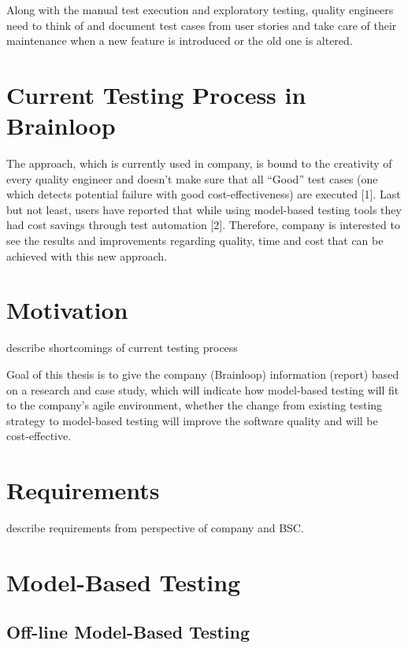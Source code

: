 


Along with the manual test execution and exploratory testing, quality engineers need to think of and document test cases from user stories and take care of their maintenance when a new feature is introduced or the old one is altered. 

\section{Current Testing Process in Brainloop}

The approach, which is currently used in company, is bound to the creativity of every quality engineer and doesn’t make sure that all “Good” test cases (one which detects potential failure with good cost-effectiveness) are executed [1]. Last but not least, users have reported that while using model-based testing tools they had cost savings through test automation [2]. Therefore, company is interested to see the results and improvements regarding quality, time and cost that can be achieved with this new approach.

\section{Motivation}

describe shortcomings of current testing process

Goal of this thesis is to give the company (Brainloop) information (report) based on a research and case study, which will indicate how model-based testing will fit to the company’s agile environment, whether the change from existing testing strategy to model-based testing will improve the software quality and will be cost-effective.

\section{Requirements}

describe requirements from perspective of company and BSC.

\section{Model-Based Testing}
\subsection{Off-line Model-Based Testing}
